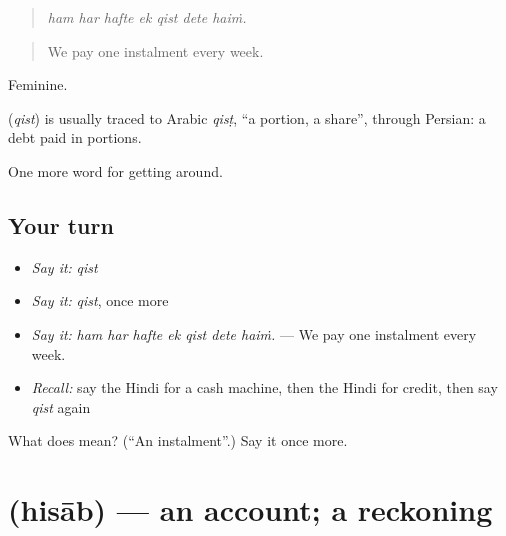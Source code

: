\begin{quote}
      
\end{quote}

\begin{quote}
\emph{ham har hafte ek qist dete haiṁ.}
\end{quote}

\begin{quote}
We pay one instalment every week.
\end{quote}

Feminine.

\begin{cousinweb}
\textbf{} (\emph{qist}) is usually traced to Arabic \emph{qisṭ}, \textquotedblleft{}a portion, a share\textquotedblright{}, through Persian: a debt paid in portions.
\end{cousinweb}

\begin{grammarlens}[title={What you've built}]
One more word for getting around.
\end{grammarlens}

\subsection*{Your turn}
\begin{itemize}
\raggedright
  \item \emph{Say it:} \emph{qist}
  \item \emph{Say it:} \emph{qist}, once more
  \item \emph{Say it:} \emph{ham har hafte ek qist dete haiṁ.} — We pay one instalment every week.
  \item \emph{Recall:} say the Hindi for a cash machine, then the Hindi for credit, then say \emph{qist} again
\end{itemize}

\begin{tcolorbox}[breakable,colback=teal!4,colframe=teal!35!black,title={Before you move on}]
What does  mean? (\textquotedblleft{}An instalment\textquotedblright{}.) Say it once more.
\end{tcolorbox}
\section[\texorpdfstring{\hi{हिसाब} (hisāb)}{हिसाब (hisāb)}]{ (hisāb) — an account; a reckoning}

\label{lesson:HI-C427-hisab}



